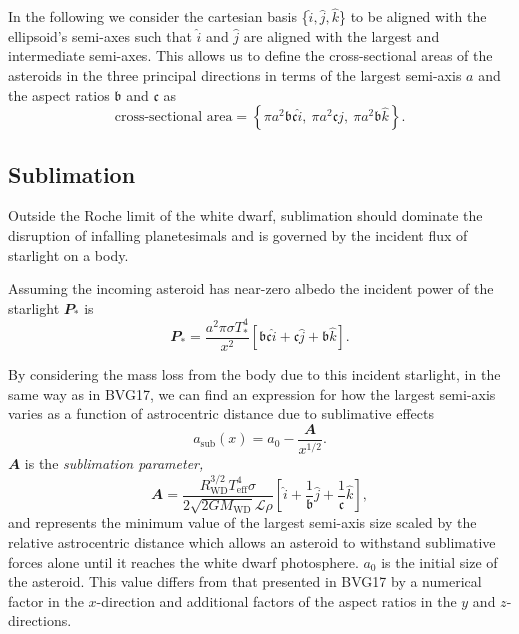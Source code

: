 \documentclass[fleqn,usenatbib]{mnras}
\begin{document}
In the following we consider the cartesian basis \{${\hat{i}, \hat{j}, \hat{k}}$\} to be aligned with the ellipsoid's semi-axes such that $\hat{i}$ and $\hat{j}$ are aligned with the largest and intermediate semi-axes. 
This allows us to define the cross-sectional areas of the asteroids in the three principal directions in terms of the largest semi-axis $a$ and the aspect ratios $\mathfrak{b}$ and $\mathfrak{c}$ as
\begin{equation}
    \label{eq:areas}
    \text{cross-sectional area} = \left\{ \pi a^2 \mathfrak{b} \mathfrak{c}\hat{i}, \: \pi a^2 \mathfrak{c} \hat{j}, \: \pi a^2 \mathfrak{b} \hat{k} \right\}.
\end{equation}

\subsection{Sublimation} \label{subsec:sublimation}
Outside the Roche limit of the white dwarf, sublimation should dominate the disruption of infalling planetesimals and is governed by the incident flux of starlight on a body.

Assuming the incoming asteroid has near-zero albedo the incident power of the starlight $\mathbfit{P}_*$ is
\begin{equation}
    \label{eq:incident_power}
    \mathbfit{P}_* = \frac{a^2 \pi \sigma T_*^4}{x^2} \left[\mathfrak{b} \mathfrak{c} \hat{i} + \mathfrak{c} \hat{j} + \mathfrak{b} \hat{k} \right].
\end{equation}

By considering the mass loss from the body due to this incident starlight, in the same way as in BVG17, we can find an expression for how the largest semi-axis varies as a function of astrocentric distance due to sublimative effects
\begin{equation}
    \label{eq:a_sub}
    a_{\text{sub}}(x) = a_0 - \frac{\mathbfit{A}}{x^{1/2}}.
\end{equation}
$\mathbfit{A}$ is the \textit{sublimation parameter,}
\begin{equation}
    \label{eq:sub_param}
    \mathbfit{A} = \frac{R_\text{WD}^{3/2} T_\text{eff}^4 \sigma}{2\sqrt{2GM_\text{WD}} \mathcal{L} \rho} \left[ \hat{i} + \frac{1}{\mathfrak{b}} \hat{j} + \frac{1}{\mathfrak{c}}\hat{k} \right],
\end{equation}
and represents the minimum value of the largest semi-axis size scaled by the relative astrocentric distance which allows an asteroid to withstand sublimative forces alone until it reaches the white dwarf photosphere. $a_0$ is the initial size of the asteroid.
This value differs from that presented in BVG17 by a numerical factor in the $x$-direction and additional factors of the aspect ratios in the $y$ and $z$-directions.
\end{document}
